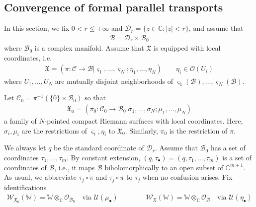 \documentclass[11pt,b5paper,notitlepage]{article}
\theoremstyle{definition}
\theoremstyle{plain}
\newcommand{\mc}{\mathcal}
\newcommand{\wtd}{\widetilde}
\newcommand{\scr}{\mathscr}
\newcommand{\sgm}{\varsigma}
\newcommand{\blt}{\bullet}
\newcommand{\Wbb}{\mathbb W}
\newcommand{\Cbb}{\mathbb C}
\newcommand{\<}{\left\langle}
\renewcommand{\>}{\right\rangle}
\newcommand{\MC}{\mathcal{C}}
\newcommand{\MB}{\mathcal{B}}
\newcommand{\fx}{\mathfrak{X}}
\numberwithin{equation}{section}
\begin{document}
\subsection{Convergence of formal parallel transports}\label{lbb30}






In this section, we fix $0<r\leq+\infty$ and $\mc D_r=\{z\in\Cbb:|z|<r\}$, and assume that
\begin{align*}
\MB=\mc D_r\times\MB_0
\end{align*}
where $\MB_0$ is a complex manifold. Assume that $\fx$ is equipped with local coordinates, i.e.
\begin{align*}
\fx=(\pi:\MC\rightarrow\MB|\sgm_1,\dots,\sgm_N;\eta_1,\dots,\eta_N )\qquad \eta_i\in\mc O(U_i)
\end{align*}
where $U_1,\dots,U_N$ are mutually disjoint neighborhoods of $\sgm_1(\MB),\dots,\sgm_N(\MB)$.

Let $\MC_0=\pi^{-1}(\{0\}\times\mc B_0)$ so that
\begin{align}\label{eqb65}
\fx_0=(\pi_0:\MC_0\rightarrow\MB_0|\sigma_1,\dots,\sigma_N;\mu_1,\dots,\mu_N )
\end{align}
a family of $N$-pointed compact Riemann surfaces with local coordinates. Here, $\sigma_i,\mu_i$ are the restrictions of $\sgm_i,\eta_i$ to $\fx_0$. Similarly, $\pi_0$ is the restriction of $\pi$.


We always let $q$ be the standard coordinate of $\mc D_r$. Assume that $\MB_0$ has a set of coordinates $\tau_1,\dots,\tau_m$. By constant extension, $(q,\tau_\blt)=(q,\tau_1,\dots,\tau_m)$ is a set of coordinates of $\MB$, i.e., it maps $\MB$ biholomorphically to an open subset of $\Cbb^{m+1}$. As usual, we abbreviate $\tau_j\circ\wtd\pi$ and $\tau_j\circ\pi$ to $\tau_j$ when no confusion arises. Fix identifications
\begin{align*}
\scr W_{\fx_0}(\Wbb)=\Wbb\otimes_\Cbb\mc O_{\MB_0}\quad\text{via }\mc U(\mu_\blt)\qquad\qquad  \scr W_\fx(\Wbb)=\Wbb\otimes_\Cbb\mc O_\MB\quad\text{via }\mc U(\eta_\blt)
\end{align*}
\end{document}
